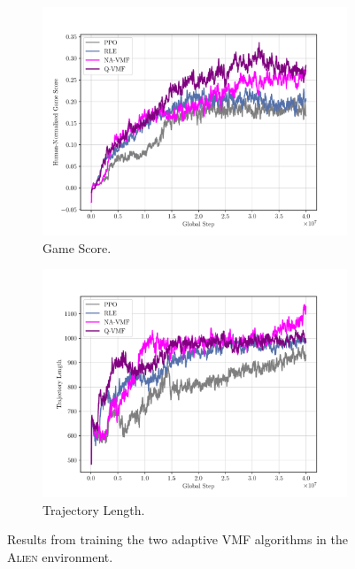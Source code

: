 \documentclass[10pt]{article} %
\begin{document}
\begin{figure}[h]
  \centering
  \begin{subfigure}[b]{0.35\textwidth}
    \includegraphics[width=\textwidth]{figures/plot_Alien_VMF Human-Normalized Game Score.pdf}
    \caption{Game Score.}
    \label{fig:vmf-game-score}
  \end{subfigure}
  \hspace{0.1\textwidth}
  \begin{subfigure}[b]{0.35\textwidth}
    \includegraphics[width=\textwidth]{figures/plot_Alien_VMF Trajectory Length.pdf}
    \caption{Trajectory Length.}
    \label{fig:vmf-trajectory-length}
  \end{subfigure}
  \label{fig:vmf-variant}
  \caption{Results from training the two adaptive VMF algorithms in the \textsc{Alien} environment.}
\end{figure}
\end{document}
